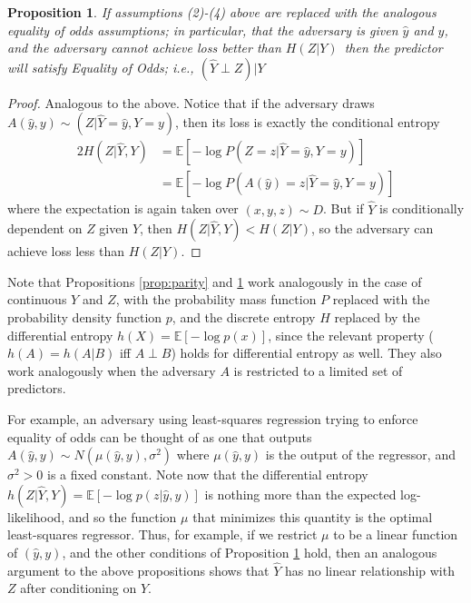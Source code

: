 \documentclass[letterpaper]{article} %
\newtheorem{proposition}{Proposition}
\theoremstyle{definition}
\begin{document}
\begin{proposition} \label{prop:eq-odds}
If assumptions (2)-(4) above are replaced with the analogous equality of odds assumptions; in particular, that the adversary is given $\hat y$ and $y$, and the adversary cannot achieve loss better than $H(Z|Y)$~then the predictor will satisfy {\sc Equality of Odds}; i.e., $(\hat Y \perp Z) | Y$
\end{proposition}
\begin{proof} 
Analogous to the above. Notice that if the adversary draws $A(\hat y, y) \sim (Z|\hat Y = \hat y, Y = y)$, then its loss is exactly the conditional entropy 
\begin{alignat*}{2}
H(Z|\hat Y,Y) &= \mathbb E[-\log P(Z=z | \hat Y=\hat y,Y=y)] \\
&= \mathbb E[-\log P(A(\hat y) = z | \hat Y=\hat y,Y=y)]
\end{alignat*}
where the expectation is again taken over $(x, y, z) \sim D$. But if $\hat Y$ is conditionally dependent on $Z$ given $Y$, then $H(Z|\hat Y, Y) < H(Z|Y)$, so the adversary can achieve loss less than $H(Z|Y)$.
\end{proof}

Note that Propositions \ref{prop:parity} and \ref{prop:eq-odds} work analogously in the case of continuous $Y$ and $Z$, with the probability mass function $P$ replaced with the probability density function $p$, and the discrete entropy $H$ replaced by the differential entropy $h(X) = \mathbb E[-\log p(x)]$, since the relevant property ($h(A) = h(A|B)$ iff $A \perp B$) holds for differential entropy as well. They also work analogously when the adversary $A$ is restricted to a limited set of predictors. 

For example, an adversary using least-squares regression trying to enforce equality of odds can be thought of as one that outputs $A(\hat y, y) \sim N(\mu(\hat y, y), \sigma^2)$ where $\mu(\hat y, y)$ is the output of the regressor, and $\sigma^2 > 0$ is a fixed constant. 
Note now that the differential entropy $h(Z|\hat Y, Y) = \mathbb{E}
[-\log p(z|\hat y, y)]$ is nothing more than the expected log-likelihood, and so the function $\mu$ that minimizes this quantity is the optimal least-squares regressor. Thus, for example, if we restrict $\mu$ to be a linear function of $(\hat y, y)$, and the other conditions of Proposition \ref{prop:eq-odds} hold, then an analogous argument to the above propositions shows that $\hat Y$ has no linear relationship with $Z$ after conditioning on $Y$. 
\end{document}
